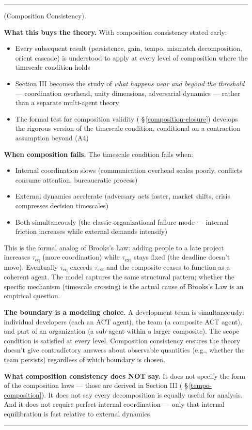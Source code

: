 \documentclass[11pt,oneside]{article}
\newcounter{claim}[section]
\renewcommand{\theclaim}{\thesection.\arabic{claim}}
\newenvironment{segment}[2]{%
  \refstepcounter{claim}%
  \bigskip\noindent\hrule\smallskip
  \noindent{\bfseries #1~\theclaim}\enskip(#2).\par\smallskip
  \noindent\ignorespaces
}{%
  \par\smallskip\noindent\hrule\bigskip
}
\newenvironment{postulate}[1][]{\begin{segment}{Postulate}{#1}}{\end{segment}}
\begin{document}
\begin{postulate}[Composition Consistency]
\textbf{What this buys the theory.} With composition consistency stated early:
\begin{itemize}
  \item Every subsequent result (persistence, gain, tempo, mismatch decomposition, orient cascade) is understood to apply at every level of composition where the timescale condition holds
  \item Section III becomes the study of \textit{what happens near and beyond the threshold} — coordination overhead, unity dimensions, adversarial dynamics — rather than a separate multi-agent theory
  \item The formal test for composition validity ( \S\,\ref{composition-closure}) develops the rigorous version of the timescale condition, conditional on a contraction assumption beyond (A4)
\end{itemize}


\textbf{When composition fails.} The timescale condition fails when:
\begin{itemize}
  \item Internal coordination slows (communication overhead scales poorly, conflicts consume attention, bureaucratic process)
  \item External dynamics accelerate (adversary acts faster, market shifts, crisis compresses decision timescales)
  \item Both simultaneously (the classic organizational failure mode — internal friction increases while external demands intensify)
\end{itemize}


This is the formal analog of Brooks's Law: adding people to a late project increases $\tau_{\text{eq}}$ (more coordination) while $\tau_{\text{ext}}$ stays fixed (the deadline doesn't move). Eventually $\tau_{\text{eq}}$ exceeds $\tau_{\text{ext}}$ and the composite ceases to function as a coherent agent. The model captures the same structural pattern; whether the specific mechanism (timescale crossing) is the actual cause of Brooks's Law is an empirical question.

\textbf{The boundary is a modeling choice.} A development team is simultaneously: individual developers (each an ACT agent), the team (a composite ACT agent), and part of an organization (a sub-agent within a larger composite). The scope condition is satisfied at every level. Composition consistency ensures the theory doesn't give contradictory answers about observable quantities (e.g., whether the team persists) regardless of which boundary is chosen.

\textbf{What composition consistency does NOT say.} It does not specify the form of the composition laws — those are derived in Section III ( \S\,\ref{tempo-composition}). It does not say every decomposition is equally useful for analysis. And it does not require perfect internal coordination — only that internal equilibration is fast relative to external dynamics.

\end{postulate}
\end{document}
